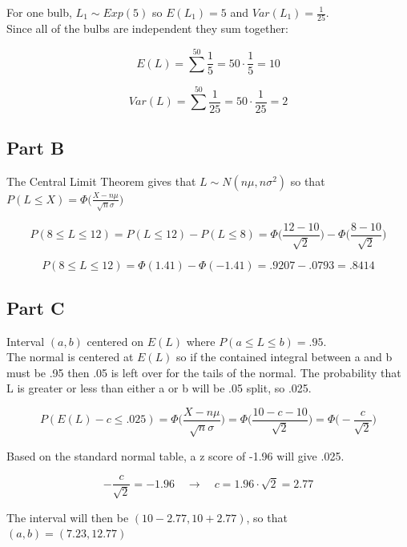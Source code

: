 \documentclass[letterpaper]{article}
\begin{document}
For one bulb, $L_1 \sim Exp(5)$ so $E(L_1) = 5$ and $Var(L_1) = \frac{1}{25}$.\\

\noindent Since all of the bulbs are independent they sum together:

$$E(L) = \sum^{50} \frac{1}{5} = 50 \cdot \frac{1}{5} = 10$$

$$Var(L) = \sum^{50} \frac{1}{25} = 50 \cdot \frac{1}{25} = 2$$

\subsection*{Part B}

The Central Limit Theorem gives that $L \sim N(n\mu, n\sigma^2)$ so that $P(L \leq X) = \Phi \Big( \frac{X - n\mu}{\sqrt{n}\sigma} \Big)$

$$P(8 \leq L \leq 12) = P(L \leq 12) - P(L \leq 8) = \Phi \Big( \frac{12 - 10}{\sqrt{2}} \Big) - \Phi \Big( \frac{8 - 10}{\sqrt{2}} \Big)$$

$$P(8 \leq L \leq 12) = \Phi (1.41) - \Phi (-1.41) = .9207 - .0793 = .8414$$

\subsection*{Part C}

Interval $(a, b)$ centered on $E(L)$ where $P(a \leq L \leq b) = .95$.\\

\noindent The normal is centered at $E(L)$ so if the contained integral between a and b must be .95 then .05 is left over for the tails of the normal. The probability that L is greater or less than either a or b will be .05 split, so .025.

$$P(E(L) - c \leq .025) = \Phi \Big( \frac{X - n\mu}{\sqrt{n}\sigma} \Big) = \Phi \Big( \frac{10 - c - 10}{\sqrt{2}} \Big) = \Phi \Big( - \frac{c}{\sqrt{2}}\Big)$$

\noindent Based on the standard normal table, a z score of -1.96 will give .025.

$$- \frac{c}{\sqrt{2}} = -1.96 \quad \rightarrow \quad c = 1.96 \cdot \sqrt{2} = 2.77$$

\noindent The interval will then be $(10 - 2.77, 10 + 2.77)$, so that $(a, b) = (7.23, 12.77)$
\end{document}
